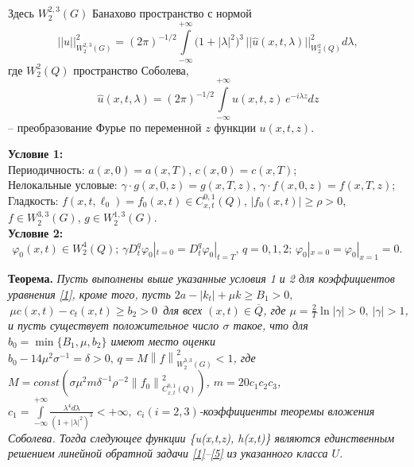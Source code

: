 Здесь $W_{2}^{2,3} (G)$ Банахово пространство с нормой
$$||u||^{2}_{W_{2}^{2,3}(G)}=(2\pi)^{-1/2}\int\limits_{-\infty}^{+\infty}\big(1+|\lambda|^{2}\big)^{3}\, ||\hat{u}(x,t,\lambda)||^{2}_{W_{2}^{2}(Q)} d \lambda,    $$
где $W_{2}^{2} (Q)$ пространство Соболева,
$$\hat{u}(x,t,\lambda )=(2\pi )^{-1/2} \int\limits_{-\infty }^{+\infty }u(x,t,z)\,  e^{-i\lambda z} dz$$
-- преобразование Фурье по переменной $z$ функции $u(x,t,z)$.

{\bf Условие 1:} \\
Периодичность: $a(x,0)=a(x,T)$, $c(x,0)=c(x,T)$;\\
Нелокальные условые:  $\gamma \cdot g(x,0,z)=g(x,T,z)$, $\gamma \cdot f(x,0,z)=f(x,T,z)$;\\
Гладкость: $f(x,t,\ell_{0})=f_{0}(x,t)\in C_{x,t}^{0,1}(Q)$, $|f_{0}(x,t)|\geq \rho >0$, $f\in W_{2}^{3,3}(G)$, $g\in W_{2}^{1,3}(G) $.\\

{\bf Условие 2:} \\
$$\varphi _{0}(x,t)\in W_{2}^{4}(Q);\, \gamma D_{t}^{q}\varphi_{0}|_{t=0}=D_{t}^{q}\varphi _{0}|_{t=T},\, q=0,1,2;\,\varphi_{0}|_{x=0}=\varphi _{0}|_{x=1}=0.\,$$

{\bf Теорема.} {\it Пусть выполнены выше указанные условия 1 и 2 для коэффициентов уравнения \eqref{1}, кроме того, пусть
$2a-\left|k_{t}\right|+\mu k\geq B_{1}>0,$ $\,\mu c(x,t)-c_{t}(x,t) \ge b_{2}>0$\, для всех  $(x,t)\in \overline{Q}$, где $\mu=\frac{2}{T} \ln \left|\gamma \right|>0,\: \left|\gamma \right|>1$, и пусть существует положительное число  $\sigma$ такое, что для $b_{0}=\min \{B_{1},\mu,b_{2}\}$ имеют место оценки  $b_{0}-14\mu^{2}\sigma^{-1}=\delta>0, \, q=M \left\|f\right\|^{2}_{W_{2}^{3,3}(G)}<1$, где $M=const\left(\sigma\mu^{2}m\delta^{-1}\rho^{-2}\left\|f_{0}\right\|^{2}_{C_{x,t}^{0,1}(Q)}\right)$,  $m=20c_{1}c_{2}c_{3}$, $c_{1}=\int\limits_{-\infty}^{+\infty}\frac{\lambda^{4}d\lambda}{\left(1+|\lambda|^{2}\right)^{3}}<+\infty,\, \, c_{i}(i=2,3)$-коэффициенты теоремы вложения Соболева. Тогда следующее функции \{u(x,t,z),\; h(x,t)\} являются единственным решением линейной обратной задачи \eqref{1}--\eqref{5} из указанного класса $U$.}

